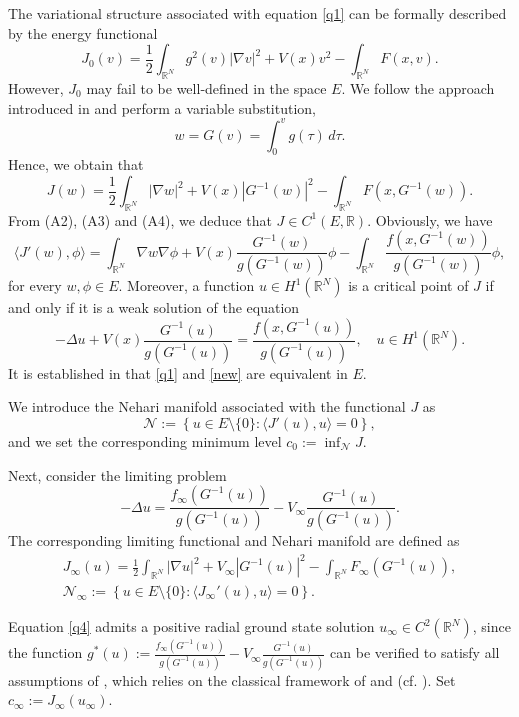 \documentclass[reqno]{amsart}
\begin{document}
The variational structure associated with equation \eqref{q1} can be formally described by 
the energy functional
$$
J_0(v)=\frac{1}{2}\int_{\mathbb{R}^N}g^2(v)|\nabla v|^2+V(x)v^2-\int_{\mathbb{R}^N}F(x,v).
$$
However, $J_0$ may fail to be well‑defined   in the space $E$. We follow the approach introduced 
in \cite{shen} and perform a variable substitution,
$$
w=G(v)=\int^v_0g(\tau)\,d\tau.
$$
Hence, we obtain that
\begin{equation}
\label{q2}
J(w)=\frac{1}{2}\int_{\mathbb{R}^{N}}|\nabla w|^{2}+V(x)|G^{-1}(w)|^2-\int_{\mathbb{R}^{N}}F(x,G^{-1}(w)).
\end{equation}
From (A2), (A3) and (A4), we deduce that $J\in C^1(E,\mathbb{R})$. Obviously, we have
\begin{equation}
\label{q3}
\langle J'(w),\phi\rangle =\int_{\mathbb{R}^{N}}\nabla w \nabla \phi+V(x)
\frac{G^{-1}(w)}{g(G^{-1}(w))}\phi-\int_{\mathbb{R}^{N}}\frac{f(x,G^{-1}(w))}{g(G^{-1}(w))}\phi,
\end{equation}
for every $w, \phi\in E$. Moreover, a function \( u \in H^1(\mathbb{R}^{N}) \) is a critical point 
of \(J\) if and only if it is a weak solution of the equation
\begin{equation}\label{new}
-\Delta u+V(x)\frac{G^{-1}(u)}{g(G^{-1}(u))}=\frac{f(x,G^{-1}(u))}{g(G^{-1}(u))}, \quad u\in H^1(\mathbb{R}^{N}).
\end{equation}
It is established in \cite{shen} that \eqref{q1} and \eqref{new} are equivalent in $E$.

We introduce the Nehari manifold associated with the functional $J$ as
$$
\mathcal{N}:=\left\{u\in E\setminus \{0\}: \langle J'(u),u\rangle=0\right\},
$$ 
and we set the corresponding minimum level $c_0:=\inf_{\mathcal{N}}J$.

Next, consider the limiting problem
\begin{equation}
\label{q4}
-\Delta u= \frac{f_{\infty}(G^{-1}(u))}{g(G^{-1}(u))}-V_{\infty}\frac{G^{-1}(u)}{g(G^{-1}(u))}.
\end{equation}
 The corresponding limiting functional and Nehari manifold are defined as
\begin{gather}
\label{q5}
J_{\infty}(u)=\frac{1}{2}\int_{\mathbb{R}^{N}}|\nabla u|^{2}+V_{\infty}|G^{-1}(u)|^2-\int_{\mathbb{R}^{N}}F_{\infty}(G^{-1}(u)), \\
\label{q6}
\mathcal{N_{\infty}}:=\left\{u\in E\setminus \{0\}: \langle J_{\infty}'(u),u\rangle=0\right\}.
\end{gather}  

Equation \eqref{q4} admits a positive radial ground state solution 
$u_{\infty} \in C^2(\mathbb{R}^N)$, since the function 
$g^*(u):=\frac{f_{\infty}(G^{-1}(u))}{g(G^{-1}(u))}-V_{\infty}\frac{G^{-1}(u)}{g(G^{-1}(u))}$ can be 
verified to satisfy all assumptions of \cite[Theorem 3.1]{colin}, which  relies on the classical 
framework of \cite{Berestycki2} and \cite{Berestycki} (cf. \cite{colin}). 
Set $c_\infty:=J_\infty(u_\infty)$.
\end{document}
